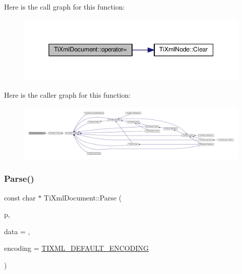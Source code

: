 Here is the call graph for this function\+:\nopagebreak
\begin{figure}[H]
\begin{center}
\leavevmode
\includegraphics[width=345pt]{class_ti_xml_document_aa56fd4dbe8917d2033d865909e2d737e_cgraph}
\end{center}
\end{figure}
Here is the caller graph for this function\+:\nopagebreak
\begin{figure}[H]
\begin{center}
\leavevmode
\includegraphics[width=350pt]{class_ti_xml_document_aa56fd4dbe8917d2033d865909e2d737e_icgraph}
\end{center}
\end{figure}
\mbox{\label{class_ti_xml_document_a789ad2f06f93d52bdb5570b2f3670289}} 
\subsubsection{\texorpdfstring{Parse()}{Parse()}}
{\footnotesize\ttfamily const char $\ast$ Ti\+Xml\+Document\+::\+Parse (\begin{DoxyParamCaption}\item[{const char $\ast$}]{p,  }\item[{\hyperlink{class_ti_xml_parsing_data}{Ti\+Xml\+Parsing\+Data} $\ast$}]{data = {},  }\item[{\hyperlink{tinyxml_8h_a88d51847a13ee0f4b4d320d03d2c4d96}{Ti\+Xml\+Encoding}}]{encoding = {\ttfamily \hyperlink{tinyxml_8h_ad5b8b092878e9010d6400cb6c13d4879}{T\+I\+X\+M\+L\+\_\+\+D\+E\+F\+A\+U\+L\+T\+\_\+\+E\+N\+C\+O\+D\+I\+NG}} }\end{DoxyParamCaption})\hspace{0.3cm}{\ttfamily [virtual]}}

